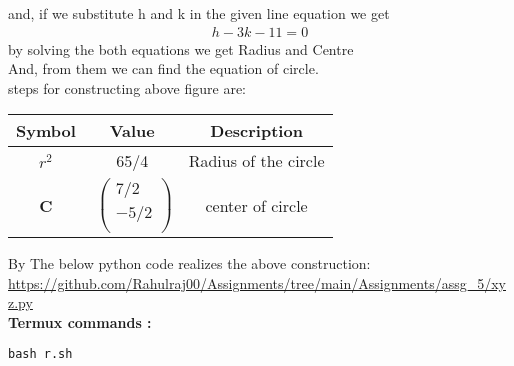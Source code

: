\documentclass[10pt, a4paper]{article}
\begin{document}
 and, if we substitute h and k in the given line equation we get\\
 \begin{align}
  h-3k-11 = 0
 \end{align}
by solving the both equations we get Radius and Centre \\
And, from them we can find the equation of circle.\\
 
steps for constructing above figure are:  
\begin{center}
\begin{tabular}{|c|c|c|}
	\hline
	\textbf{Symbol}&\textbf{Value}&\textbf{Description}\\
	\hline
	$r^2$&65/4&Radius of the circle\\
	\hline
	\textbf{C}&$\
	\begin{pmatrix}
		7/2 \\
		-5/2 \\
	\end{pmatrix}$
	&center of circle\\
	\hline
	
\end{tabular}
\end{center}
\vspace{1mm}
By 
The below python code realizes the above construction:	\\
\url{https://github.com/Rahulraj00/Assignments/tree/main/Assignments/assg_5/xyz.py}\\
\textbf{Termux commands :}
\begin{lstlisting}
bash r.sh
\end{lstlisting}

\end{document}

